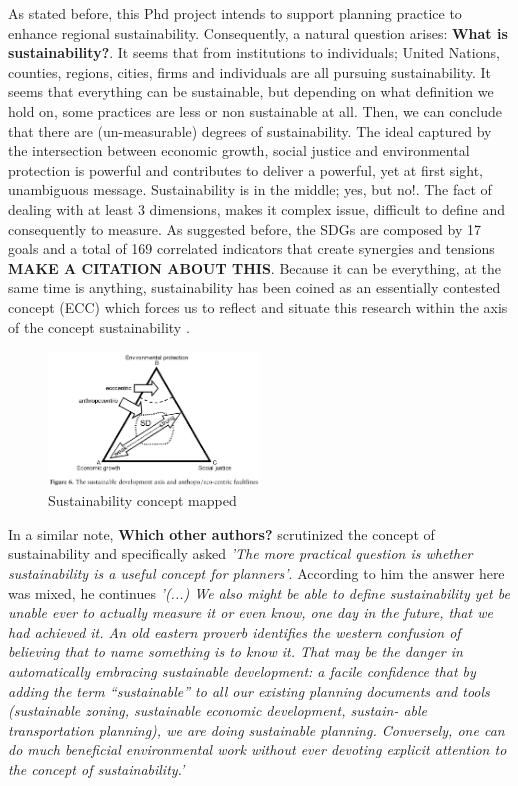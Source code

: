 As stated before, this Phd project intends to support planning practice to enhance regional sustainability. Consequently, a natural question arises: \textbf{What is sustainability?}. It seems that from institutions to individuals; United Nations, counties, regions, cities, firms and individuals are all pursuing sustainability. It seems that everything can be sustainable, but depending on what definition we hold on, some practices are less or non sustainable at all. Then, we can conclude that there are (un-measurable) degrees of sustainability. The ideal captured by the intersection between economic growth, social justice and environmental protection is powerful and contributes to deliver a powerful, yet at first sight, unambiguous message. Sustainability is in the middle; yes, but no!. The fact of dealing with at least 3 dimensions, makes it complex issue, difficult to define and consequently to measure. As suggested before, the SDGs are composed by 17 goals and a total of 169 correlated indicators that create synergies and tensions \textbf{MAKE A CITATION ABOUT THIS}. Because it can be everything, at the same time is anything, sustainability has been coined as an essentially contested concept (ECC) which forces us to reflect and situate this research within the axis of the concept sustainability \parencite{Connelly2007}. 

\begin{figure}[h!]
    \centering
    \includegraphics[width=0.5\textwidth]{sections/asset/contested.PNG}
    \caption{Sustainability concept mapped}
    \label{fig:sustainable_map}
\end{figure}


In a similar note, \textcite{Campbell1996} \textbf{Which other authors?} scrutinized the concept of sustainability and specifically asked \textit{'The more practical question is whether sustainability is a useful concept for planners'}. According to him the answer here was mixed, he continues \textit{'(...) We also might be able to define sustainability yet be unable ever to actually measure it or even know, one day in the future, that we had achieved it. An old eastern proverb identifies the western confusion of believing that to name something is to know it. That may be the danger in automatically embracing sustainable development: a facile confidence that by adding the term “sustainable” to all our existing planning documents and tools (sustainable zoning, sustainable economic development, sustain- able transportation planning), we are doing sustainable planning. Conversely, one can do much beneficial environmental work without ever devoting explicit attention to the concept of sustainability.'}\par

